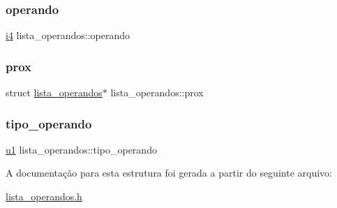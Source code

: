 \subsubsection{\texorpdfstring{operando}{operando}}
{\footnotesize\ttfamily \hyperlink{lista__operandos_8h_a7bc084923d20fddbe46335d882c6fda2}{i4} lista\+\_\+operandos\+::operando}

\mbox{\label{structlista__operandos_a90699e5c7f710177b37754cd5231c9f5}} 
\subsubsection{\texorpdfstring{prox}{prox}}
{\footnotesize\ttfamily struct \hyperlink{structlista__operandos}{lista\+\_\+operandos}$\ast$ lista\+\_\+operandos\+::prox}

\mbox{\label{structlista__operandos_af64bc84846f21a809f68b783f0e39f40}} 
\subsubsection{\texorpdfstring{tipo\+\_\+operando}{tipo\_operando}}
{\footnotesize\ttfamily \hyperlink{lista__operandos_8h_ad9f4cdb6757615aae2fad89dab3c5470}{u1} lista\+\_\+operandos\+::tipo\+\_\+operando}



A documentação para esta estrutura foi gerada a partir do seguinte arquivo\+:\begin{DoxyCompactItemize}
\item 
\hyperlink{lista__operandos_8h}{lista\+\_\+operandos.\+h}\end{DoxyCompactItemize}
